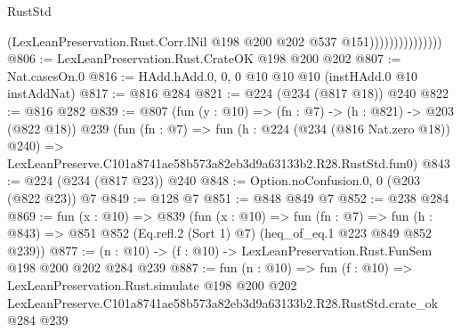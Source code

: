 \begin{lexlean}{RustStd}
\begin{coremodule}
                                (LexLeanPreservation.Rust.Corr.lNil
                                  @198
                                  @200
                                  @202
                                  @537
                                  @151)))))))))))))))
@806 := LexLeanPreservation.Rust.CrateOK @198 @200 @202
@807 := Nat.casesOn.{0}
@816 := HAdd.hAdd.{0, 0, 0} @10 @10 @10 (instHAdd.{0} @10 instAddNat)
@817 := @816 @284
@821 := @224 (@234 (@817 @18)) @240
@822 := @816 @282
@839 := @807
    (fun (y : @10) => (fn : @7) -> (h : @821) -> @203 (@822 @18))
    @239
    (fun (fn : @7) =>
    fun (h : @224 (@234 (@816 Nat.zero @18)) @240) =>
    LexLeanPreserve.C101a8741ae58b573a82eb3d9a63133b2.R28.RustStd.fun0)
@843 := @224 (@234 (@817 @23)) @240
@848 := Option.noConfusion.{0, 0} (@203 (@822 @23)) @7
@849 := @128 @7
@851 := @848 @849 @7
@852 := @238 @284
@869 := fun (x : @10) =>
  @839
    (fun (x : @10) =>
    fun (fn : @7) =>
    fun (h : @843) => @851 @852 (Eq.refl.{2} (Sort 1) @7) (heq_of_eq.{1} @223 @849 @852 @239))
@877 := (n : @10) -> (f : @10) -> LexLeanPreservation.Rust.FunSem @198 @200 @202 @284 @239
@887 := fun (n : @10) =>
  fun (f : @10) =>
  LexLeanPreservation.Rust.simulate
    @198
    @200
    @202
    LexLeanPreserve.C101a8741ae58b573a82eb3d9a63133b2.R28.RustStd.crate_ok
    @284
    @239
\end{coremodule}
\end{lexlean}
